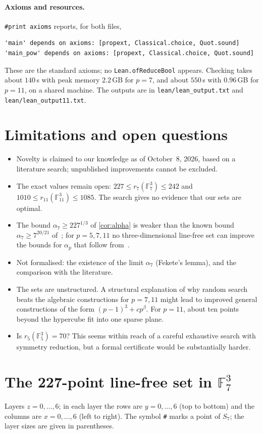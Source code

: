 \documentclass[11pt]{article}
\numberwithin{equation}{section}
\theoremstyle{definition}
\theoremstyle{remark}
\newcommand{\F}{\mathbb F}
\begin{document}
\paragraph{Axioms and resources.} \texttt{\#print axioms} reports, for both files,
\begin{lstlisting}
'main' depends on axioms: [propext, Classical.choice, Quot.sound]
'main_pow' depends on axioms: [propext, Classical.choice, Quot.sound]
\end{lstlisting}
These are the standard axioms; no \texttt{Lean.ofReduceBool} appears. Checking takes about
$140$\,s with peak memory $2.2$\,GB for $p=7$, and about $550$\,s with $0.96$\,GB for $p=11$,
on a shared machine. The outputs are in \texttt{lean/lean\_output.txt} and
\texttt{lean/lean\_output11.txt}.

\section{Limitations and open questions}
\begin{itemize}
\item Novelty is claimed to our knowledge as of October~8, 2026, based on a literature search;
unpublished improvements cannot be excluded.
\item The exact values remain open: $227\le r_7(\F_7^3)\le242$ and
$1010\le r_{11}(\F_{11}^3)\le1085$. The search gives no evidence that our sets are optimal.
\item The bound $\alpha_7\ge227^{1/3}$ of \cref{cor:alpha} is weaker than the known bound
$\alpha_7\ge7^{20/21}$ of~\cite{FuhrerTaranchuk}; for $p=5,7,11$ no three-dimensional
line-free set can improve the bounds for $\alpha_p$ that follow from~\cite{FuhrerTaranchuk}.
\item Not formalised: the existence of the limit $\alpha_7$ (Fekete's lemma), and the comparison
with the literature.
\item The sets are unstructured. A structural explanation of why random search beats the
algebraic constructions for $p=7,11$ might lead to improved general constructions of the form
$(p-1)^3+cp^{\beta}$. For $p=11$, about ten points beyond the hypercube fit into one sparse
plane.
\item Is $r_5(\F_5^3)=70$? This seems within reach of a careful exhaustive search with symmetry
reduction, but a formal certificate would be substantially harder.
\end{itemize}

\appendix
\section{The 227-point line-free set in \texorpdfstring{$\F_7^3$}{F7^3}}\label{app:set7}
Layers $z=0,\dots,6$; in each layer the rows are $y=0,\dots,6$ (top to bottom) and the columns
are $x=0,\dots,6$ (left to right). The symbol \texttt{\#} marks a point of $S_7$; the layer sizes
are given in parentheses.
{\small

}
\end{document}
